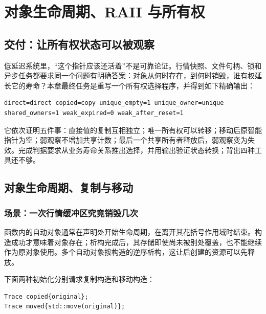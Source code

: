 \chapter{对象生命周期、RAII 与所有权}


\section{交付：让所有权状态可以被观察}

低延迟系统里，“这个指针应该还活着”不是可靠论证。行情快照、文件句柄、锁和异步任务都要求同一个问题有明确答案：对象从何时存在，到何时销毁，谁有权延长它的寿命？本章最终任务是重写一个所有权选择程序，并得到如下精确输出：

\begin{lstlisting}[numbers=none]
direct=direct copied=copy unique_empty=1 unique_owner=unique shared_owners=1 weak_expired=0 weak_after_reset=1
\end{lstlisting}

它依次证明五件事：直接值的复制互相独立；唯一所有权可以转移；移动后原智能指针为空；弱观察不增加共享计数；最后一个共享所有者释放后，弱观察变为失效。完成判据要求从业务寿命关系推出选择，并用输出验证状态转换；背出四种工具还不够。

\section{对象生命周期、复制与移动}

\subsection{场景：一次行情缓冲区究竟销毁几次}

函数内的自动对象通常在声明处开始生命周期，在离开其花括号作用域时结束。构造成功才意味着对象存在；析构完成后，其存储即使尚未被别处覆盖，也不能继续作为原对象使用。多个自动对象按构造的逆序析构，这让后创建的资源可以先释放。

下面两种初始化分别请求复制构造和移动构造：

\begin{lstlisting}[numbers=none]
Trace copied{original};
Trace moved{std::move(original)};
\end{lstlisting}

